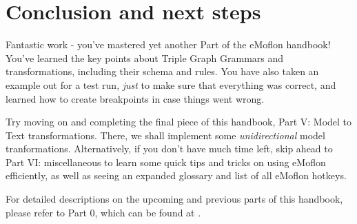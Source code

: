 \section{Conclusion and next steps}
\genHeader

\vspace{0.5cm}


Fantastic work - you've mastered yet another Part of the eMoflon handbook! You've learned the key points about Triple Graph Grammars and transformations,
including their schema and rules. You have also taken an example out for a test run, \emph{just} to make sure that everything was correct, and learned how to
create breakpoints in case things went wrong.

Try moving on and completing the final piece of this handbook, Part V: Model to Text transformations. There, we shall implement some \emph{unidirectional} model
tranformations. Alternatively, if you don't have much time left, skip ahead to Part VI: miscellaneous to learn some quick tips and tricks on using eMoflon
efficiently, as well as seeing an expanded glossary and list of all eMoflon hotkeys.

For detailed descriptions on the upcoming and previous parts of this handbook, please refer to Part 0, which can be found at \dlPartZero.
